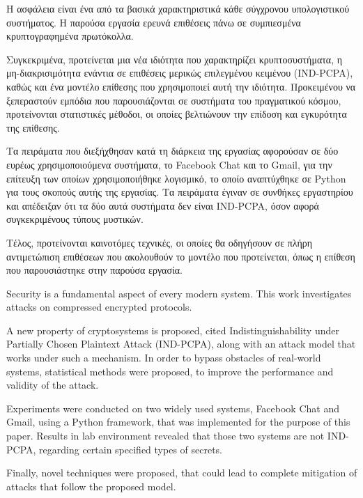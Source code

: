 \begin{abstractgr}

Η ασφάλεια είναι ένα από τα βασικά χαρακτηριστικά κάθε σύγχρονου υπολογιστικού
συστήματος. Η παρούσα εργασία ερευνά επιθέσεις πάνω σε συμπιεσμένα
κρυπτογραφημένα πρωτόκολλα.

Συγκεκριμένα, προτείνεται μια νέα ιδιότητα που χαρακτηρίζει κρυπτοσυστήματα, η
μη-διακρισιμότητα ενάντια σε επιθέσεις μερικώς επιλεγμένου κειμένου (IND-PCPA),
καθώς και ένα μοντέλο επίθεσης που χρησιμοποιεί αυτή την ιδιότητα. Προκειμένου
να ξεπεραστούν εμπόδια που παρουσιάζονται σε συστήματα του πραγματικού κόσμου,
προτείνονται στατιστικές μέθοδοι, οι οποίες βελτιώνουν την επίδοση και
εγκυρότητα της επίθεσης.

Τα πειράματα που διεξήχθησαν κατά τη διάρκεια της εργασίας αφορούσαν σε δύο
ευρέως χρησιμοποιούμενα συστήματα, το Facebook Chat και το Gmail, για την
επίτευξη των οποίων χρησιμοποιήθηκε λογισμικό, το οποίο αναπτύχθηκε σε Python
για τους σκοπούς αυτής της εργασίας. Τα πειράματα έγιναν σε συνθήκες εργαστηρίου
και απέδειξαν ότι τα δύο αυτά συστήματα δεν είναι IND-PCPA, όσον αφορά
συγκεκριμένους τύπους μυστικών.

Τέλος, προτείνονται καινοτόμες τεχνικές, οι οποίες θα οδηγήσουν σε πλήρη
αντιμετώπιση επιθέσεων που ακολουθούν το μοντέλο που προτείνεται, όπως η
επίθεση που παρουσιάστηκε στην παρούσα εργασία.

\end{abstractgr}

\begin{abstracten}

Security is a fundamental aspect of every modern system. This work investigates
attacks on compressed encrypted protocols.

A new property of cryptosystems is proposed, cited Indistinguishability under
Partially Chosen Plaintext Attack (IND-PCPA), along with an attack model that
works under such a mechanism. In order to bypass obstacles of real-world
systems, statistical methods were proposed, to improve the performance and
validity of the attack.

Experiments were conducted on two widely used systems, Facebook Chat and Gmail, using
a Python framework, that was implemented for the purpose of this paper. Results
in lab environment revealed that those two systems are not IND-PCPA, regarding
certain specified types of secrets.

Finally, novel techniques were proposed, that could lead to complete mitigation
of attacks that follow the proposed model.

\end{abstracten}
